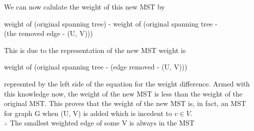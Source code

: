 \documentclass[11pt]{amsart}
\begin{document}
\newpage
\hspace*{15mm}We can now calulate the weight of this new MST by
\begin{center}
    weight of (original spanning tree) - weight of (original spanning tree - \\(the removed edge - (U, V)))
\end{center}
This is due to the representation of the new MST weight is
\begin{center}
    weight of (original spanning tree - (edge removed - (U, V)))
\end{center}
represnted by the left side of the equation for the weight difference. Armed with this knowledge now, the weight of the new MST is less than the weight of the original MST. This proves that the weight of the new MST is, in fact, an MST for graph G when (U, V) is added which is incedent to $v\in V$.\\
$\therefore$ The smallest weighted edge of some V is always in the MST
\end{document}
